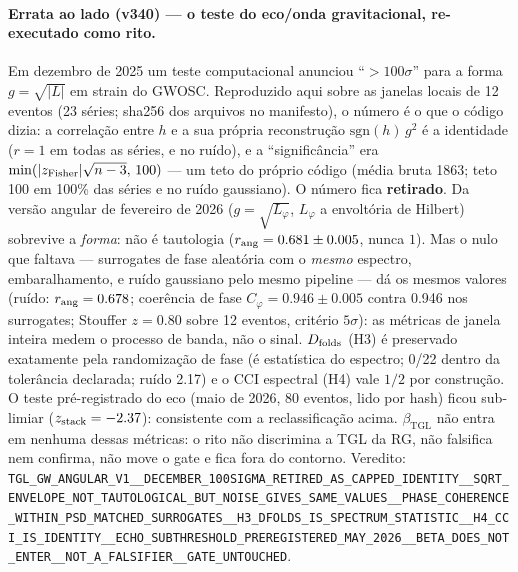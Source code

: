 \documentclass[11pt]{article}
\newcommand{\bTGL}{\beta_{\mathrm{TGL}}}\newcommand{\Msun}{M_{\odot}}\newcommand{\TGL}{\mathrm{TGL}}
\theoremstyle{definition}\newtheorem{deriv}{Derivação}
\begin{document}
\paragraph*{Errata ao lado (v340) --- o teste do eco/onda gravitacional, re-executado como rito.} Em dezembro de 2025 um teste computacional anunciou ``$>100\sigma$'' para a forma $g=\sqrt{|L|}$ em strain do GWOSC. Reproduzido aqui sobre as janelas locais de 12 eventos (23 séries; sha256 dos arquivos no manifesto), o número é o que o código dizia: a correlação entre $h$ e a sua própria reconstrução $\mathrm{sgn}(h)\,g^2$ é a identidade ($r=1$ em todas as séries, e no ruído), e a ``significância'' era $\min(|z_{\rm Fisher}|\sqrt{n-3},\,100)$ --- um teto do próprio código (média bruta 1863; teto 100 em 100\% das séries e no ruído gaussiano). O número fica \textbf{retirado}. Da versão angular de fevereiro de 2026 ($g=\sqrt{L_\varphi}$, $L_\varphi$ a envoltória de Hilbert) sobrevive a \emph{forma}: não é tautologia ($r_{\rm ang}=0.681\pm0.005$, nunca $1$). Mas o nulo que faltava --- surrogates de fase aleatória com o \emph{mesmo} espectro, embaralhamento, e ruído gaussiano pelo mesmo pipeline --- dá os mesmos valores (ruído: $r_{\rm ang}=0.678$; coerência de fase $C_\varphi=0.946\pm0.005$ contra 0.946 nos surrogates; Stouffer $z=0.80$ sobre 12 eventos, critério $5\sigma$): as métricas de janela inteira medem o processo de banda, não o sinal. $D_{\rm folds}$ (H3) é preservado exatamente pela randomização de fase (é estatística do espectro; 0/22 dentro da tolerância declarada; ruído 2.17) e o CCI espectral (H4) vale $1/2$ por construção. O teste pré-registrado do eco (maio de 2026, 80 eventos, lido por hash) ficou sub-limiar ($z_{\rm stack}=-2.37$): consistente com a reclassificação acima. $\bTGL$ não entra em nenhuma dessas métricas: o rito não discrimina a TGL da RG, não falsifica nem confirma, não move o gate e fica fora do contorno. Veredito: \texttt{TGL\_GW\_ANGULAR\_V1\_\_DECEMBER\_100SIGMA\_RETIRED\_AS\_CAPPED\_IDENTITY\_\_SQRT\_ENVELOPE\_NOT\_TAUTOLOGICAL\_BUT\_NOISE\_GIVES\_SAME\_VALUES\_\_PHASE\_COHERENCE\_WITHIN\_PSD\_MATCHED\_SURROGATES\_\_H3\_DFOLDS\_IS\_SPECTRUM\_STATISTIC\_\_H4\_CCI\_IS\_IDENTITY\_\_ECHO\_SUBTHRESHOLD\_PREREGISTERED\_MAY\_2026\_\_BETA\_DOES\_NOT\_ENTER\_\_NOT\_A\_FALSIFIER\_\_GATE\_UNTOUCHED}.
\end{document}
